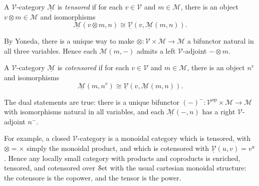 \begin{definition}[Tensored]\label{dfn:3.9}
	A $\mathcal{V} $-category $\underline{\mathcal{M} } $ is \emph{tensored} if for each $v\in \mathcal{V} $ and $m\in \mathcal{M} $, there is an object $v\otimes m\in \mathcal{M} $ and isomorphisms
	\[
		\underline{\mathcal{M} } (v\otimes m,n)\cong \underline{\mathcal{V} } (v,\underline{\mathcal{M} } (m,n))
	.\]
\end{definition}

By Yoneda, there is a unique way to make $\otimes : \mathcal{V} \times \mathcal{M}  \to \mathcal{M} $ a bifunctor natural in all three variables. Hence each $\mathcal{M} (m,-)$ admits a left $\mathcal{V} $-adjoint $-\otimes m$.

\begin{definition}[Cotensored]\label{dfn:3.10}
	A $\mathcal{V} $-category $\underline{\mathcal{M} } $ is \emph{cotensored} if for each $v\in \mathcal{V} $ and $m\in \mathcal{M} $, there is an object $n^v$ and isomorphisms
	\[
		\underline{\mathcal{M} } (m,n^v)\cong \underline{\mathcal{V} } (v,\underline{\mathcal{M} } (m,n))
	.\]
\end{definition}
The dual statements are true: there is a unique bifunctor $(-)^-: \mathcal{V} ^{\mathrm{op}} \times \mathcal{M}  \to \mathcal{M} $ with isomorphisms natural in all variables, and each $\underline{\mathcal{M} } (-,n)$ has a right $\mathcal{V} $-adjoint $n^-$.

For example, a closed $\mathcal{V} $-category is a monoidal category which is tensored, with $\otimes=\times $ simply the monoidal product, and which is cotensored with $\underline{\mathcal{V} }(u,v)=v^u$. Hence any locally small category with products and coproducts is enriched, tensored, and cotensored over $\mathcal{S}\mathrm{et} $ with the usual cartesian monoidal structure: the cotensore is the copower, and the tensor is the power.


